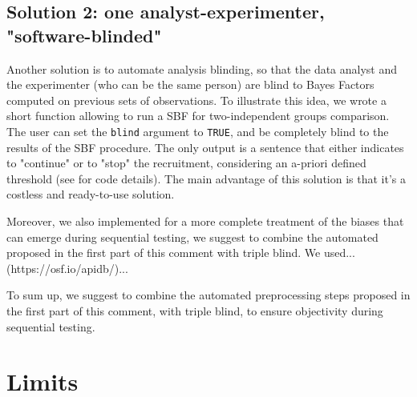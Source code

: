 \documentclass[a4paper,man,natbib,floatsintext,donotrepeattitle]{apa6}
\begin{document}
\subsection{Solution 2: one analyst-experimenter, "software-blinded"}

Another solution is to automate analysis blinding, so that the data analyst and the experimenter (who can be the same person) are blind to Bayes Factors computed on previous sets of observations. To illustrate this idea, we wrote a short function allowing to run a SBF for two-independent groups comparison. The user can set the \texttt{blind} argument to \texttt{TRUE}, and be completely blind to the results of the SBF procedure. The only output is a sentence that either indicates to "continue" or to "stop" the recruitment, considering an a-priori defined threshold (see  for code details). The main advantage of this solution is that it's a costless and ready-to-use solution.

Moreover, we also implemented  for a more complete treatment of the biases that can emerge during sequential testing, we suggest to combine the automated proposed in the first part of this comment with triple blind. We used... (https://osf.io/apidb/)...

To sum up, we suggest to combine the automated preprocessing steps proposed in the first part of this comment, with triple blind, to ensure objectivity during sequential testing.



\section{Limits}
\end{document}
